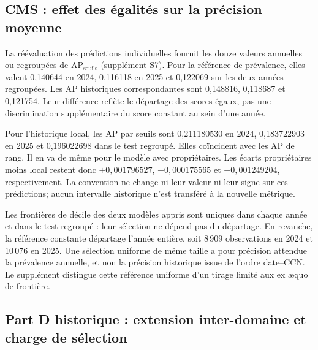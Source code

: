 \subsection{CMS : effet des égalités sur la précision moyenne}
\label{sec:ties}
La réévaluation des prédictions individuelles fournit les douze valeurs annuelles ou regroupées de $\mathrm{AP}_{\mathrm{seuils}}$ (supplément S7). Pour la référence de prévalence, elles valent 0,140644 en 2024, 0,116118 en 2025 et 0,122069 sur les deux années regroupées. Les AP historiques correspondantes sont 0,148816, 0,118687 et 0,121754. Leur différence reflète le départage des scores égaux, pas une discrimination supplémentaire du score constant au sein d'une année.

Pour l'historique local, les AP par seuils sont 0,211180530 en 2024, 0,183722903 en 2025 et 0,196022698 dans le test regroupé. Elles coïncident avec les AP de rang. Il en va de même pour le modèle avec propriétaires. Les écarts propriétaires moins local restent donc $+0,001796527$, $-0,000175565$ et $+0,001249204$, respectivement. La convention ne change ni leur valeur ni leur signe sur ces prédictions; aucun intervalle historique n'est transféré à la nouvelle métrique.

Les frontières de décile des deux modèles appris sont uniques dans chaque année et dans le test regroupé : leur sélection ne dépend pas du départage. En revanche, la référence constante départage l'année entière, soit 8\,909 observations en 2024 et 10\,076 en 2025. Une sélection uniforme de même taille a pour précision attendue la prévalence annuelle, et non la précision historique issue de l'ordre date--CCN. Le supplément distingue cette référence uniforme d'un tirage limité aux ex æquo de frontière.

\subsection{Part D historique : extension inter-domaine et charge de sélection}

\begin{table}[!htbp]
\centering\small
\caption{Part D, test 2024, identité générique exacte. Les rappels sont à $K=10$. Rappel et MRR concernent les 1\,019 prescripteurs avec positifs ; P@10 utilise les 2\,000 prescripteurs admissibles. Le BPR macro/MRR est repris à six décimales du rapport. Sources : résumé et exécution compacte\cite{hgbresults,hgbpartd}.}
\label{tab:partd}

\end{table}


